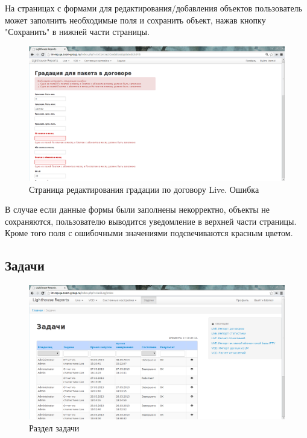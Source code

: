 На страницах с формами для редактирования/добавления объектов пользователь может заполнить
необходимые поля и сохранить объект, нажав кнопку "Сохранить" в нижней части страницы.

\begin{figure}[!ht]
\begin{center}
\hspace*{-1cm} \includegraphics[scale=0.35, trim=0mm 0mm 120mm 10mm, clip]{../resources/screens/contract_gradation_error.png}
\caption{Страница редактирования градации по договору Live. Ошибка}
\end{center}
\end{figure}

В случае если данные формы были заполнены некорректно, объекты не сохраняются,
пользователю выводится уведомление в верхней части страницы. 
Кроме того поля с ошибочными значениями подсвечиваются красным цветом.

\subsection*{Задачи}

\begin{figure}[!ht]
\begin{center}
\hspace*{-1cm} \includegraphics[scale=0.35, trim=0mm 0mm 0mm 10mm, clip]{../resources/screens/tasks.png}
\caption{Раздел задачи}
\end{center}
\end{figure}

